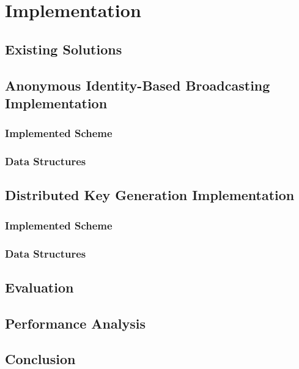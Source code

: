 \chapter{Implementation}
\label{cha:n}

\section{Existing Solutions}

\section{Anonymous Identity-Based Broadcasting Implementation}

\subsection{Implemented Scheme}

\subsection{Data Structures}

\section{Distributed Key Generation Implementation}

\subsection{Implemented Scheme}

\subsection{Data Structures}

\section{Evaluation}

\section{Performance Analysis}

\section{Conclusion}


